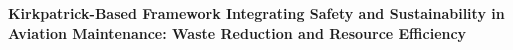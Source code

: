\documentclass[12pt,a4paper]{article}
\begin{document}
\begin{center}
{\large\bfseries Kirkpatrick-Based Framework Integrating Safety and Sustainability in Aviation Maintenance: Waste Reduction and Resource Efficiency\par}
\end{center}
\vspace{6pt}










\printbibliography[title={References}]
\end{document}
